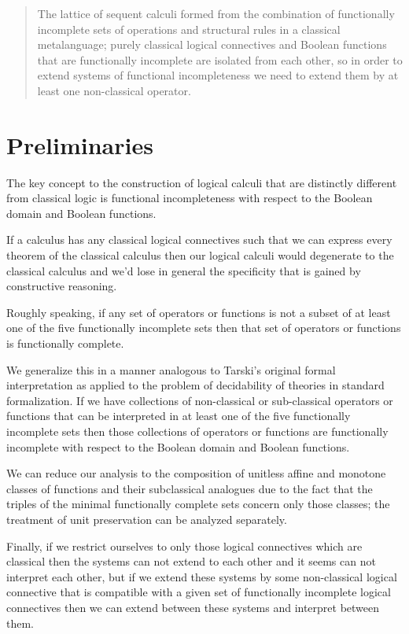 


\begin{abstract}
The lattice of sequent calculi formed from the combination of functionally incomplete sets of operations and structural rules in a classical metalanguage; purely classical logical connectives and Boolean functions that are functionally incomplete are isolated from each other, so in order to extend systems of functional incompleteness we need to extend them by at least one non-classical operator.
\end{abstract}

\part{Preliminaries}
\begin{center}
	\begin{flushleft}
		The key concept to the construction of logical calculi that are distinctly different from classical logic is functional incompleteness with respect to the Boolean domain and Boolean functions.
	\end{flushleft}
	\begin{flushleft}
		If a calculus has any classical logical connectives such that we can express every theorem of the classical calculus then our logical calculi would degenerate to the classical calculus and we'd lose in general the specificity that is gained by constructive reasoning.
	\end{flushleft}
	\begin{flushleft}
		Roughly speaking, if any set of operators or functions is not a subset of at least one of the five functionally incomplete sets then that set of operators or functions is functionally complete.
	\end{flushleft}
	\begin{flushleft}
		We generalize this in a manner analogous to Tarski's original formal interpretation as applied to the problem of decidability of theories in standard formalization. If we have collections of non-classical or sub-classical operators or functions that can be interpreted in at least one of the five functionally incomplete sets then those collections of operators or functions are functionally incomplete with respect to the Boolean domain and Boolean functions.
	\end{flushleft}
	\begin{flushleft}
	We can reduce our analysis to the composition of unitless affine and monotone classes of functions and their subclassical analogues due to the fact that the triples of the minimal functionally complete sets concern only those classes; the treatment of unit preservation can be analyzed separately.
	\end{flushleft}
	\begin{flushleft}
		Finally, if we restrict ourselves to only those logical connectives which are classical then the systems can not extend to each other and it seems can not interpret each other, but if we extend these systems by some non-classical logical connective that is compatible with a given set of functionally incomplete logical connectives then we can extend between these systems and interpret between them.
	\end{flushleft}

\end{center}
